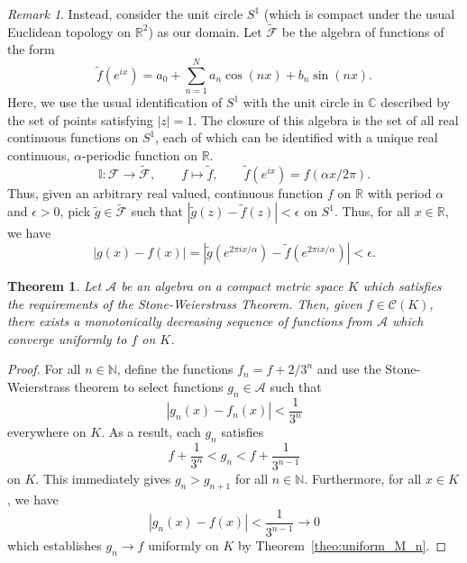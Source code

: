 \documentclass[11pt]{article}
\def\C{\mathbb{C}}
\def\R{\mathbb{R}}
\def\N{\mathbb{N}}
\newtheorem{theorem}{Theorem}[section]
\theoremstyle{definition}
\theoremstyle{remark}
\newtheorem*{remark}{Remark}
\begin{document}
    \begin{remark}
        Instead, consider the unit circle $S^1$ (which is compact under the usual
        Euclidean topology on $\R^2$) as our domain. Let $\tilde{\mathscr{F}}$ be the
        algebra of functions of the form \[
            \tilde{f}(e^{ix}) = a_0 + \sum_{n = 1}^N a_n \cos(nx) + b_n\sin(nx).
        \] Here, we use the usual identification of $S^1$ with the unit circle in
        $\C$ described by the set of points satisfying $|z| = 1$. The closure of this
        algebra is the set of all real continuous functions on $S^1$, each of which
        can be identified with a unique real continuous, $\alpha$-periodic function
        on $\R$. \[
            \mathbb{I}\colon \mathscr{F} \to \tilde{\mathscr{F}}, \qquad
            f \mapsto \tilde{f}, \qquad
            \tilde{f}(e^{ix}) = f(\alpha x / 2\pi).
        \] Thus, given an arbitrary real valued, continuous function $f$ on $\R$ with
        period $\alpha$ and $\epsilon > 0$, pick $\tilde{g} \in \tilde{\mathscr{F}}$
        such that $|\tilde{g}(z) - \tilde{f}(z)| < \epsilon$ on $S^1$. Thus, for all
        $x \in \R$, we have \[
            |g(x) - f(x)| = |\tilde{g}(e^{2\pi ix / \alpha}) - \tilde{f}(e^{2\pi i x /
            \alpha})| < \epsilon.
        \] 
    \end{remark}

    \begin{theorem}
        Let $\mathscr{A}$ be an algebra on a compact metric space $K$ which satisfies
        the requirements of the Stone-Weierstrass Theorem. Then, given $f \in
        \mathscr{C}(K)$, there exists a monotonically decreasing sequence of
        functions from $\mathscr{A}$ which converge uniformly to $f$ on $K$.
    \end{theorem}
    \begin{proof}
        For all $n \in \N$, define the functions $f_n = f + 2 /3^{n}$ and use the
        Stone-Weierstrass theorem to select functions $g_n \in \mathscr{A}$ such that
        \[
            |g_n(x) - f_n(x)| < \frac{1}{3^n}
        \] everywhere on $K$. As a result, each $g_n$ satisfies \[
            f + \frac{1}{3^{n}} < g_n < f + \frac{1}{3^{n - 1}}
        \] on $K$. This immediately gives $g_n > g_{n + 1}$ for all $n \in \N$.
        Furthermore, for all $x \in K$, we have \[
            |g_n(x) - f(x)| < \frac{1}{3^{n - 1}} \to 0
        \] which establishes $g_n \to f$ uniformly on $K$ by
        Theorem~\ref{theo:uniform_M_n}.
    \end{proof}
\end{document}
